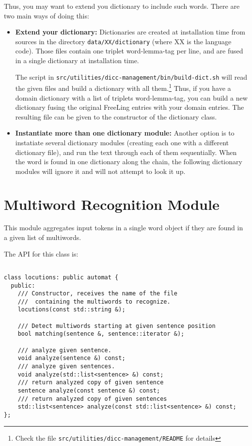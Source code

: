 \documentclass[a4paper]{book}
\begin{document}
 Thus, you may want to extend you dictionary to include such
 words. There are two main ways of doing this:
\begin{itemize}
\item \textbf{Extend your dictionary:} Dictionaries are created at
  installation time from sources in the directory
  \texttt{data/XX/dictionary} (where XX is the language code).  Those
  files contain one triplet word-lemma-tag per line, and are fused in
  a single dictionary at installation time.

The script in \texttt{src/utilities/dicc-management/bin/build-dict.sh}
will read the given files and build a dictionary with all
them.\footnote{Check the file
  \texttt{src/utilities/dicc-management/README} for details} Thus, if
you have a domain dictionary with a list of triplets word-lemma-tag,
you can build a new dictionary fusing the original FreeLing entries
with your domain entries. The resulting file can be given to the
constructor of the dictionary class.

\item \textbf{Instantiate more than one dictionary module:} Another
  option is to instatiate several dictionary modules (creating each
  one with a different dictionary file), and run the text through each
  of them sequentially. When the word is found in one dictionary along
  the chain, the following dictionary modules will ignore it and will
  not attempt to look it up.
\end{itemize}


\section{Multiword Recognition Module}
\label{file-mw}

  This module aggregates input tokens in a single word object if they
  are found in a given list of multiwords.

  The API for this class is:
\begin{verbatim}

class locutions: public automat {
  public:
    /// Constructor, receives the name of the file
    ///  containing the multiwords to recognize.
    locutions(const std::string &);

    /// Detect multiwords starting at given sentence position
    bool matching(sentence &, sentence::iterator &);

    /// analyze given sentence.
    void analyze(sentence &) const;
    /// analyze given sentences.
    void analyze(std::list<sentence> &) const;
    /// return analyzed copy of given sentence
    sentence analyze(const sentence &) const;
    /// return analyzed copy of given sentences
    std::list<sentence> analyze(const std::list<sentence> &) const;
};
\end{verbatim}
\end{document}
